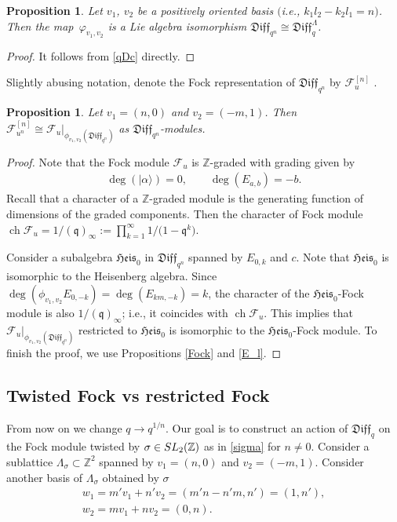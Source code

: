\documentclass[11pt]{article}
\numberwithin{equation}{section}
\newtheorem{Proposition}[Theorem]{Proposition}
\theoremstyle{definition}
\newcommand{\qd}[1]{ \mathfrak{Diff}_{q^{#1}} }
\newcommand{\qD}{\mathfrak{Diff}_q}
\newcommand{\qDn}{\mathfrak{Diff}_{q^n}}
\newcommand{\Hem}{\mathfrak{Heis}}
\DeclareMathOperator{\ch}{ch}
\begin{document}
\begin{Proposition}
Let $v_1$, $v_2$ be a positively oriented basis $($i.e., $k_1 l_2 - k_2 l_1 =n)$. Then the map~$\varphi_{v_1, v_2}$ is a Lie algebra isomorphism $\qDn \cong \qD^{\Lambda}$.
\end{Proposition}

\begin{proof}It follows from \eqref{qDc} directly.
\end{proof}

Slightly abusing notation, denote the Fock representation of $\qDn$ by $\mathcal{F}_u^{[n]}$ .

\begin{Proposition} \label{LambdaFock}
Let $v_1 = (n,0)$ and $v_2 =(-m, 1)$. Then $ \mathcal{F}_{u^{n}}^{[n]} \cong \left. \mathcal{F}_u \right|_{\phi_{v_1, v_2} \left(\qd{n} \right)}$ as $\qd{n}$-modules.
\end{Proposition}

\begin{proof}
Note that the Fock module $\mathcal{F}_u$ is $\mathbb{Z}$-graded with grading given by
\begin{gather*}
\deg(| \alpha \rangle) = 0, \qquad \deg (E_{a,b})=-b.
\end{gather*}
Recall that a character of a $\mathbb{Z}$-graded module is the generating function of dimensions of the graded components. Then the character of Fock module $\ch \mathcal{F}_u = 1/(\mathfrak{q})_{ \infty } := \prod\limits_{k=1}^{\infty} 1/\big(1-\mathfrak{q}^k\big)$.

Consider a subalgebra $\Hem_0$ in $\qd{n}$ spanned by $E_{0, k}$ and $c$. Note that $\Hem_0$ is isomorphic to the Heisenberg algebra. Since $\deg (\phi_{v_1,v_2}E_{0,-k} )= \deg (E_{km,-k}) = k$, the character of the $\Hem_0$-Fock module is also $1/(\mathfrak{q})_{\infty}$; i.e., it coincides with $\ch \mathcal{F}_u$. This implies that $\left. \mathcal{F}_u \right|_{\phi_{v_1, v_2} \left(\qd{n} \right)}$ restricted to $\Hem_0$ is isomorphic to the $\Hem_0$-Fock module. To finish the proof, we use Propositions \ref{Fock} and \ref{E_l}.
\end{proof}

\subsection{Twisted Fock vs restricted Fock}
From now on we change $q \rightarrow q^{1/n}$.
Our goal is to construct an action of $\qD$ on the Fock module twisted by $\sigma \in {\rm SL}_2 ( \mathbb{Z} )$ as in \eqref{sigma} for $n \neq 0$. Consider a sublattice $\Lambda_{\sigma} \subset \mathbb{Z}^2$ spanned by $v_1 = (n,0)$ and $v_2 = (-m, 1)$. Consider another basis of $\Lambda_{\sigma}$ obtained by $\sigma$
\begin{gather}
w_1= m' v_1 + n' v_2 = (m' n - n' m, n') = (1, n'), \label{eq: v to w change 1} \\
w_2= m v_1 + n v_2 = (0, n). \label{eq: v to w change 2}
\end{gather}
\end{document}
